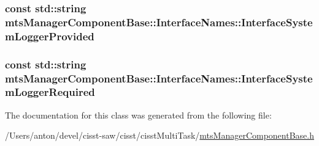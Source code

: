 \subsubsection[{Interface\+System\+Logger\+Provided}]{\setlength{\rightskip}{0pt plus 5cm}const std\+::string mts\+Manager\+Component\+Base\+::\+Interface\+Names\+::\+Interface\+System\+Logger\+Provided\hspace{0.3cm}{\ttfamily [static]}}\label{classmts_manager_component_base_1_1_interface_names_ad5ed77aeed44addf0fbb46df6c621012}
\hypertarget{classmts_manager_component_base_1_1_interface_names_ac9a7050301a0c9b7a3f91b8b5655d209}{}
\subsubsection[{Interface\+System\+Logger\+Required}]{\setlength{\rightskip}{0pt plus 5cm}const std\+::string mts\+Manager\+Component\+Base\+::\+Interface\+Names\+::\+Interface\+System\+Logger\+Required\hspace{0.3cm}{\ttfamily [static]}}\label{classmts_manager_component_base_1_1_interface_names_ac9a7050301a0c9b7a3f91b8b5655d209}


The documentation for this class was generated from the following file\+:\begin{DoxyCompactItemize}
\item 
/\+Users/anton/devel/cisst-\/saw/cisst/cisst\+Multi\+Task/\hyperlink{mts_manager_component_base_8h}{mts\+Manager\+Component\+Base.\+h}\end{DoxyCompactItemize}
